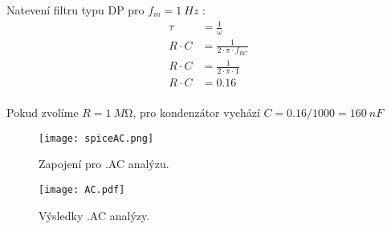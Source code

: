 Natevení filtru typu DP pro \(f_{m} =  \qty{1}{Hz}\) :
\begin{align*}
    \tau &= \frac{1}{\omega} \\
    R\cdot C &= \frac{1}{2\cdot \pi \cdot f_{RC} } \\
    R\cdot C &= \frac{1}{2\cdot \pi \cdot 1 } \\
    R\cdot C &= \num{0.16} \\
\end{align*}

Pokud zvolíme \(R=\qty{1}{M\ohm}\), pro kondenzátor vychází \(C=\num{0.16}/1000 = \qty{160}{nF}\) 

\begin{figure}[h!]
    \centering
    \texttt{[image: spiceAC.png]}
    \caption{Zapojení pro .AC analýzu.}
    \label{fig:spice1.png}
\end{figure}

\begin{figure}[h!]
    \centering
    \texttt{[image: AC.pdf]}
    \caption{Výsledky .AC analýzy.}
    \label{fig:spice1.png}
\end{figure}


